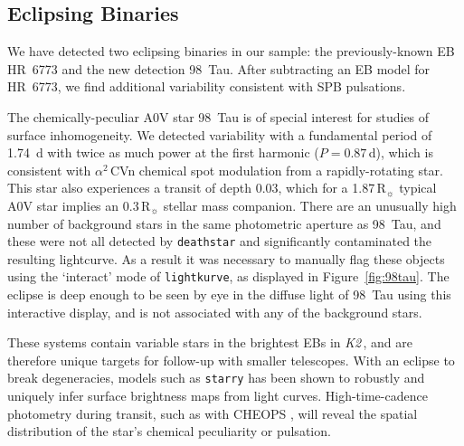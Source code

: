 \documentclass[modern]{aastex62}
\newcommand{\numax}{\mbox{$\nu_{\rm max}$}\xspace}
\newcommand{\Dnu}{\mbox{$\Delta \nu$}\xspace}
\newcommand{\muHz}{\mbox{$\mu$Hz}\xspace}
\newcommand{\rsun}{\mbox{$\mathrm{R}_{\sun}$}\xspace}
\newcommand\ktwo{\emph{K2}\,}
\begin{document}
\begin{figure*}
\caption{Summary plots for \textsc{k2sc}-corrected final halo light curve for the red giant $\eta$~Cancri, in the same format as Figure~\ref{fig:rholeo}. Solar like oscillations are clearly detected with $\numax = 22.9 \pm 0.9$\,\muHz and $\Dnu = 2.7 \pm 0.03$\,\muHz.}
\label{fig:etacnc}
\end{figure*}


\subsection{Eclipsing Binaries}
\label{sec:ebs}

We have detected two eclipsing binaries in our sample: the previously-known EB HR~6773 and the new detection 98~Tau. After subtracting an EB model for HR~6773, we find additional variability consistent with SPB pulsations. 

The chemically-peculiar A0V star 98~Tau is of special interest for studies of surface inhomogeneity. We detected variability with a fundamental period of 1.74~d with twice as much power at the first harmonic ($P = 0.87$\,d), which is consistent with $\alpha^2$\,CVn chemical spot modulation from a rapidly-rotating star. This star also experiences a transit of depth 0.03, which for a 1.87\,\rsun typical A0V star implies an 0.3\,\rsun stellar mass companion. There are an unusually high number of background stars in the same photometric aperture as 98~Tau, and these were not all detected by \texttt{deathstar} and significantly contaminated the resulting lightcurve. As a result it was necessary to manually flag these objects using the `interact' mode of \texttt{lightkurve}, as displayed in Figure~\ref{fig:98tau}. The eclipse is deep enough to be seen by eye in the diffuse light of 98~Tau using this interactive display, and is not associated with any of the background stars.

These systems contain variable stars in the brightest EBs in \ktwo, and are therefore unique targets for follow-up with smaller telescopes. With an eclipse to break degeneracies, models such as \texttt{starry} \citep{starry} has been shown to robustly and uniquely infer surface brightness maps from light curves. High-time-cadence photometry during transit, such as with CHEOPS \citep{cheops}, will reveal the spatial distribution of the star's chemical peculiarity or pulsation. 

\begin{figure*}
\caption{Summary plots for \textsc{k2sc}-corrected final halo light curve for the eclipsing binary 98~Tauri, in a similar format to Figure~\ref{fig:rholeo}. The residuals to the position and time GP are not shown, as the time GP fits poorly to the deep eclipse. The polynomial trend and Lomb-Scargle periodograms are conditioned on the out-of-transit points only.}
\label{fig:98tau}
\end{figure*}
\end{document}
